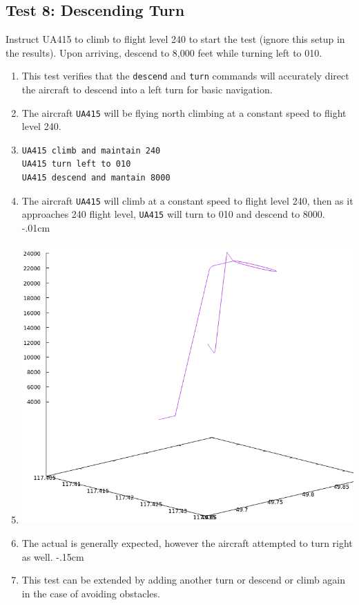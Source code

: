 \documentclass[letterpaper, 12pt]{article}
\begin{document}
\subsection{Test 8: Descending Turn}
Instruct UA415 to climb to flight level 240 to start the test (ignore this setup in the results). Upon arriving, descend to 8,000 feet while turning left to 010.
\begin{enumerate}\itemsep-.15cm
\item This test verifies that the \verb!descend! and \verb!turn! commands will accurately direct the aircraft to descend into a left turn for basic navigation.
\item The aircraft \verb!UA415! will be flying north climbing at a constant speed to flight level 240. 
\item \begin{verbatim}
UA415 climb and maintain 240
UA415 turn left to 010
UA415 descend and mantain 8000
\end{verbatim}
\item The aircraft \verb!UA415! will climb at a constant speed to flight level 240, then as it approaches 240 flight level, \verb!UA415! will turn to 010 and descend to 8000.
\itemsep-.01cm
\item \includegraphics[scale=.4,valign=t,center]{test8.png}
\item The actual is generally expected, however the aircraft attempted to turn right as well.
\itemsep-.15cm
\item This test can be extended by adding another turn or descend or climb again in the case of avoiding obstacles.
\end{enumerate}
\end{document}
